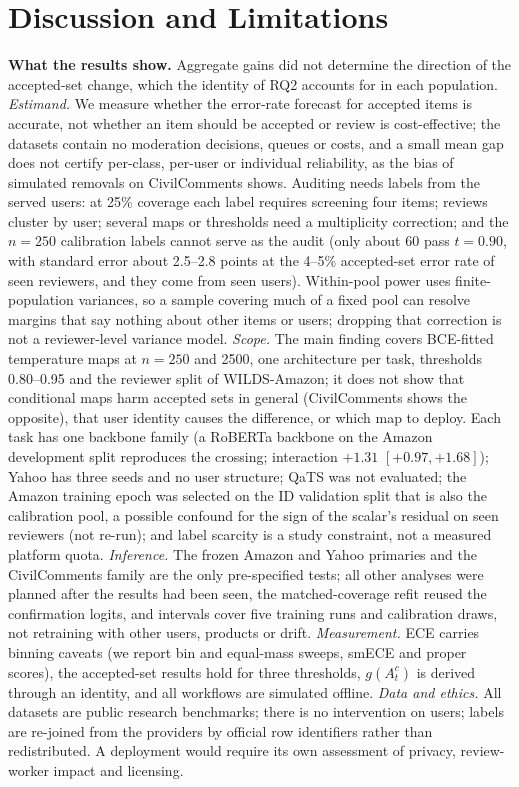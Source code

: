 \documentclass[sigconf,anonymous,review]{acmart}
\begin{document}
\section{Discussion and Limitations}
\label{sec:discussion}

\textbf{What the results show.} Aggregate gains did not determine the
direction of the accepted-set change, which the identity of RQ2 accounts for
in each population.
\emph{Estimand.} We measure whether the error-rate
forecast for accepted items is accurate, not whether an item should be
accepted or review is cost-effective; the datasets contain no moderation
decisions, queues or costs, and a small mean gap does not certify
per-class, per-user or individual reliability, as the bias of simulated removals on CivilComments shows. Auditing needs labels from the served users:
at 25\% coverage each label requires screening four items; reviews
cluster by user; several maps or thresholds need a multiplicity
correction; and the $n{=}250$ calibration labels cannot serve as the
audit (only about 60 pass $t{=}0.90$, with standard error about 2.5--2.8
points at the 4--5\% accepted-set error rate of seen reviewers, and they
come from seen users). Within-pool power uses finite-population
variances, so a sample covering much of a fixed pool can resolve margins
that say nothing about other items or users; dropping that correction is
not a reviewer-level variance model. \emph{Scope.} The main finding
covers BCE-fitted temperature maps at $n{=}250$ and 2500, one
architecture per task, thresholds 0.80--0.95 and the reviewer split of
WILDS-Amazon; it does not show that conditional maps harm accepted sets
in general (CivilComments shows the opposite), that user identity causes
the difference, or which map to deploy. Each task has one backbone
family (a RoBERTa backbone on the Amazon development split reproduces the
crossing; interaction $+1.31$ $[+0.97,+1.68]$); Yahoo has three seeds and
no user structure; QaTS was not evaluated; the Amazon training epoch was
selected on the ID validation split that is also the calibration pool, a
possible confound for the sign of the scalar's residual on seen
reviewers (not re-run); and label scarcity is a study constraint, not a
measured platform quota. \emph{Inference.} The frozen Amazon and Yahoo
primaries and the CivilComments family are the only pre-specified tests;
all other analyses were planned after the results had been seen, the
matched-coverage refit reused the confirmation logits, and intervals
cover five training runs and calibration draws, not retraining with
other users, products or drift. \emph{Measurement.} ECE carries binning
caveats (we report bin and equal-mass sweeps, smECE and proper scores),
the accepted-set results hold for three thresholds, $g(A_t^c)$ is derived
through an identity, and all workflows are simulated offline.
\emph{Data and ethics.} All datasets are public research benchmarks;
there is no intervention on users; labels are re-joined from the providers by official row identifiers
rather than redistributed. A deployment would
require its own assessment of privacy, review-worker impact and
licensing.
\end{document}

